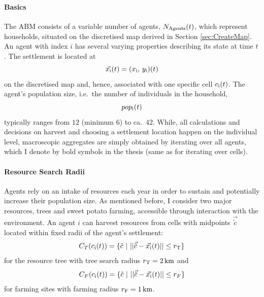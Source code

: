 \paragraph{Basics}
The ABM consists of a variable number of agents, $N_{\rm Agents}(t)$, which represent households, situated on the discretised map derived in Section \ref{sec:CreateMap}.
An agent with index $i$ has several varying properties describing its state at time $t$.
The settlement is located at 
\begin{equation}
	\vec{x_{\rm i}}(t) = (x_{\rm i},\, y_{\rm i})(t)
\end{equation}
 on the discretised map and, hence, associated with one specific cell $c_{\rm i}(t)$.
 The agent's population size, i.e.\ the number of individuals in the household, 
 \begin{equation}pop_{\rm i}(t) \end{equation}
 typically ranges from $12$ (minimum $6$) to ca.\ $42$.%
While, all calculations and decisions on harvest and choosing a settlement location happen on the individual level, macroscopic aggregates are simply obtained by iterating over all agents, which I denote by bold symbols in the thesis (same as for iterating over cells). 

\paragraph{Resource Search Radii}
Agents rely on an intake of resources each year in order to sustain and potentially increase their population size.
As mentioned before, I consider two major resources, trees and sweet potato farming, accessible through interaction with the environment.
An agent $i$ can harvest resources from cells with midpoints $\vec{\tilde{c}}$ located within fixed radii of the agent's settlement:
\begin{equation} \label{eq:Circle_T}
C_{T}(c_{\rm i}(t)) = \{ \tilde{c}\ | \   | |  \vec{\tilde{c}} - \vec{x_{\rm i}}(t) | |  \leq r_{\rm T} \} 
\end{equation}
for the resource tree with tree search radius $r_{\rm T} =2\, {\rm km}$ and 
\begin{equation} \label{eq:Circle_F}
C_{F}(c_{\rm i}(t)) = \{ \tilde{c}\ | \   | |  \vec{\tilde{c}} - \vec{x_{\rm i}}(t) | |  \leq r_{F} \}
\end{equation}
for farming sites with farming radius $r_{\rm F} = 1\, {\rm km}$.

